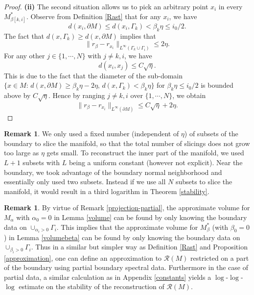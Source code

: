 \documentclass[11pt,letterpaper]{amsart}
\numberwithin{equation}{section}
\theoremstyle{definition}
\theoremstyle{plain}
\theoremstyle{definition}
\theoremstyle{plain}
\theoremstyle{definition}
\newtheorem{remark}[remark0]{Remark}
\theoremstyle{plain}
\begin{document}
\begin{proof}
\noindent \textbf{(ii)} The second situation allows us to pick an arbitrary point $x_i$ in every $M_{\beta[k,i]}^{\ast}$. Observe from Definition \ref{Rast} that for any $x_i$, we have 
$$d(x_i,\partial M)\leqslant d(x_i,\Gamma_k) < \beta_k\eta\leqslant i_0/2.$$
The fact that $d(x,\Gamma_k)\geqslant d(x,\partial M)$ implies that
$$\|r_{\beta}-r_{x_i}\|_{L^{\infty}(\Gamma_k\cup\Gamma_i)}\leqslant 2\eta.$$
For any other $j\in\{1,\cdots,N\}$ with $j\neq k,i$, we have
$$d(x_i,x_j)\leqslant C\sqrt{\eta}.$$
This is due to the fact that the diameter of the sub-domain $\{x\in M: \, d(x,\partial M)\geqslant \beta_k\eta-2\eta,\, d(x,\Gamma_k)<\beta_k\eta \}$ for $\beta_k\eta\leqslant i_0/2$ is bounded above by $C\sqrt{\eta}$.
Hence by ranging $j\neq k,i$ over $\{1,\cdots,N\}$, we obtain
\begin{equation*}\label{rbeta}
\|r_{\beta}-r_{x_i}\|_{L^{\infty}(\partial M)}\leqslant C\sqrt{\eta}+2\eta.
\end{equation*}
\vspace{-4mm}
\end{proof}

\begin{remark}\label{remark-thirdlog}
We only used a fixed number (independent of $\eta$) of subsets of the boundary to slice the manifold, so that the total number of slicings does not grow too large as $\eta$ gets small. To reconstruct the inner part of the manifold, we used $L+1$ subsets with $L$ being a uniform constant (however not explicit). Near the boundary, we took advantage of the boundary normal neighborhood and essentially only used two subsets. Instead if we use all $N$ subsets to slice the manifold, it would result in a third logarithm in Theorem \ref{stability}. 
\end{remark}

\begin{remark}\label{approximation-partial}
By virtue of Remark \ref{projection-partial}, the approximate volume for $M_{\alpha}$ with $\alpha_0=0$ in Lemma \ref{volume} can be found by only knowing the boundary data on $\cup_{\alpha_i>0} \Gamma_i$. This implies that the approximate volume for $M_{\beta}^{\ast}$ (with $\beta_0=0$) in Lemma \ref{volumebeta} can be found by only knowing the boundary data on $\cup_{\beta_i>0} \Gamma_i$. Thus in a similar but simpler way as Definition \ref{Rast} and Proposition \ref{approximation}, one can define an approximation to $\mathcal{R}(M)$ restricted on a part of the boundary using partial boundary spectral data. Furthermore in the case of partial data, a similar calculation as in Appendix \ref{constants} yields a $\log$-$\log$-$\log$ estimate on the stability of the reconstruction of $\mathcal{R}(M)$.
\end{remark}
\end{document}
